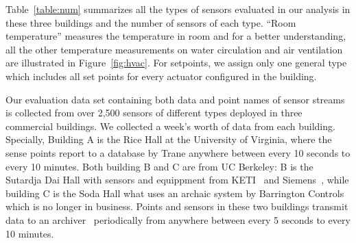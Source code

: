 Table~\ref{table:num} summarizes all the types of sensors evaluated in our analysis in these three buildings and the number of sensors of each type. ``Room temperature'' measures the temperature in room and for a better understanding, all the other temperature measurements on water circulation and air ventilation are illustrated in Figure~\ref{fig:hvac}. For setpoints, we assign only
one general type which includes all set points for every actuator configured in the building.

Our evaluation data set containing both data and point names of sensor streams is collected from over 2,500 sensors of different types deployed in three commercial buildings. 
We collected a week's worth of data from each building.
Specially, Building A is the Rice Hall at the University of Virginia, where the sense points report to a database by Trane anywhere between every 10 seconds to every 10 minutes.
Both building B and C are from UC Berkeley: B is the Sutardja Dai Hall with sensors and equippment from KETI~\cite{keti} and Siemens~\cite{bacnet}, while building C is the Soda Hall what uses an archaic system by Barrington Controls which is no longer in business. 
Points and sensors in these two buildings transmit data to an archiver~\cite{smap} periodically from anywhere between every 5 seconds to every 10 minutes.


